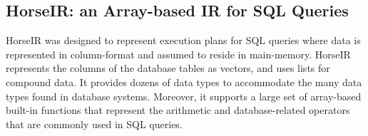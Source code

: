 \subsection{HorseIR: an Array-based IR for SQL Queries}

HorseIR \OldPaper was designed to represent execution plans for SQL queries
where data is represented in column-format and assumed to reside in
main-memory. HorseIR represents the columns of the database tables as vectors,
and uses lists for compound data. It provides dozens of data types to
accommodate the many data types found in database systems. 
Moreover, it supports a large set of array-based built-in functions that
represent the arithmetic and database-related operators that are commonly used
in SQL queries.

